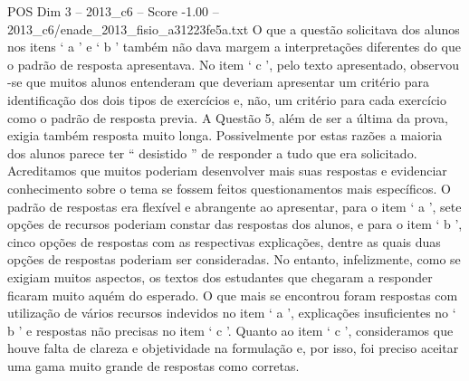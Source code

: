 \begin{textsample}{POS Dim 3 – 2013\_c6 – Score -1.00 – 2013\_c6/enade\_2013\_fisio\_a31223fe5a.txt}
O que a questão solicitava dos alunos nos itens ‘ a ’ e ‘ b ’ também não dava margem a interpretações diferentes do que o padrão de resposta apresentava.
No item ‘ c ’, pelo texto apresentado, observou -se que muitos alunos entenderam que deveriam apresentar um critério para identificação dos dois tipos de exercícios e, não, um critério para cada exercício como o padrão de resposta previa.
A Questão 5, além de ser a última da prova, exigia também resposta muito longa.
Possivelmente por estas razões a maioria dos alunos parece ter “ desistido ” de responder a tudo que era solicitado.
Acreditamos que muitos poderiam desenvolver mais suas respostas e evidenciar conhecimento sobre o tema se fossem feitos questionamentos mais específicos.
O padrão de respostas era flexível e abrangente ao apresentar, para o item ‘ a ’, sete opções de recursos poderiam constar das respostas dos alunos, e para o item ‘ b ’, cinco opções de respostas com as respectivas explicações, dentre as quais duas opções de respostas poderiam ser consideradas.
No entanto, infelizmente, como se exigiam muitos aspectos, os textos dos estudantes que chegaram a responder ficaram muito aquém do esperado.
O que mais se encontrou foram respostas com utilização de vários recursos indevidos no item ‘ a ’, explicações insuficientes no ‘ b ’ e respostas não precisas no item ‘ c ’.
Quanto ao item ‘ c ’, consideramos que houve falta de clareza e objetividade na formulação e, por isso, foi preciso aceitar uma gama muito grande de respostas como corretas.

\end{textsample}

